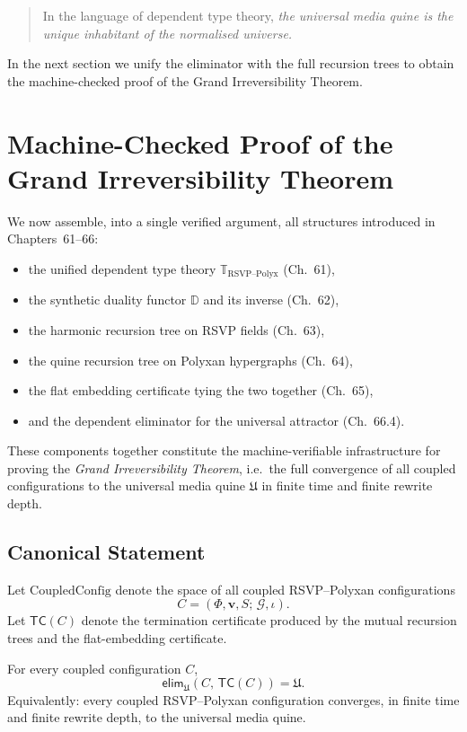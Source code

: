 \begin{quote}
In the language of dependent type theory,  
\emph{the universal media quine is the unique inhabitant of the normalised universe.}
\end{quote}

In the next section we unify the eliminator with the full recursion trees to obtain the machine-checked proof of the Grand Irreversibility Theorem.

\section{Machine-Checked Proof of the Grand Irreversibility Theorem}
\label{sec:66-5}

We now assemble, into a single verified argument, all structures introduced in Chapters~61--66:

\begin{itemize}
\item the unified dependent type theory $\mathbb{T}_{\text{RSVP--Polyx}}$ (Ch.~61),
\item the synthetic duality functor $\mathbb{D}$ and its inverse (Ch.~62),
\item the harmonic recursion tree on RSVP fields (Ch.~63),
\item the quine recursion tree on Polyxan hypergraphs (Ch.~64),
\item the flat embedding certificate tying the two together (Ch.~65),
\item and the dependent eliminator for the universal attractor (Ch.~66.4).
\end{itemize}

These components together constitute the machine-verifiable infrastructure for proving the \emph{Grand Irreversibility Theorem}, i.e.\ the full convergence of all coupled configurations to the universal media quine $\mathfrak{U}$ in finite time and finite rewrite depth.

\subsection{Canonical Statement}

Let $\mathrm{CoupledConfig}$ denote the space of all coupled RSVP--Polyxan configurations
\[
   C = (\Phi, \mathbf{v}, S;\, \mathcal{G}, \iota).
\]
Let $\mathsf{TC}(C)$ denote the termination certificate produced by the mutual recursion trees and the flat-embedding certificate.

\begin{theorem}
\label{thm:grand-irrev-machine}
For every coupled configuration $C$,
\[
   \mathsf{elim}_{\mathfrak{U}}(C,\, \mathsf{TC}(C)) = \mathfrak{U}.
\]
Equivalently: every coupled RSVP--Polyxan configuration converges, in finite time and finite rewrite depth, to the universal media quine.
\end{theorem}

